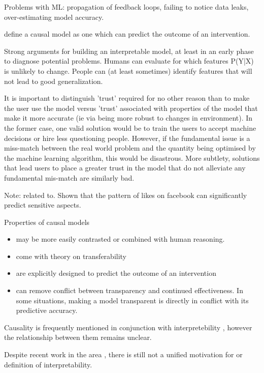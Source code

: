 \documentclass{article}
\theoremstyle{plain}
\theoremstyle{definition}
\begin{document}
\cite{Ribeiro2016} Problems with ML: propagation of feedback loops, failing to notice data leaks, over-estimating model accuracy.

\cite{Duvenaud2000} define a causal model as one which can predict the outcome of an intervention.


Strong arguments for building an interpretable model, at least in an early phase to diagnose potential problems. 
Humans can evaluate for which features P(Y|X) is unlikely to change. People can (at least sometimes) identify features that will not lead to good generalization. 

It is important to distinguish 'trust' required for no other reason than to make the user use the model versus 'trust' associated with properties of the model that make it more accurate (ie via being more robust to changes in environment). In the former case, one valid solution would be to train the users to accept machine decisions or hire less questioning people. However, if the fundamental issue is a miss-match between the real world problem and the quantity being optimised by the machine learning algorithm, this would be disastrous. More subtlety, solutions that lead users to place a greater trust in the model that do not alleviate any fundamental mis-match are similarly bad. 

Note: related to. Shown that the pattern of likes on facebook can significantly predict sensitive aspects. 




Properties of causal models
\begin{itemize}
\item may be more easily contrasted or combined with human reasoning.
\item come with theory on transferability
\item are explicitly designed to predict the outcome of an intervention 
\item can remove conflict between transparency and continued effectiveness.
In some situations, making a model transparent is directly in conflict with its predictive accuracy. 
\end{itemize}




Causality is frequently mentioned in conjunction with interpretebility \cite{}, however the relationship between them remains unclear. 

Despite recent work in the area \cite{}, there is still not a unified motivation for or definition of interpretability. 
\end{document}
